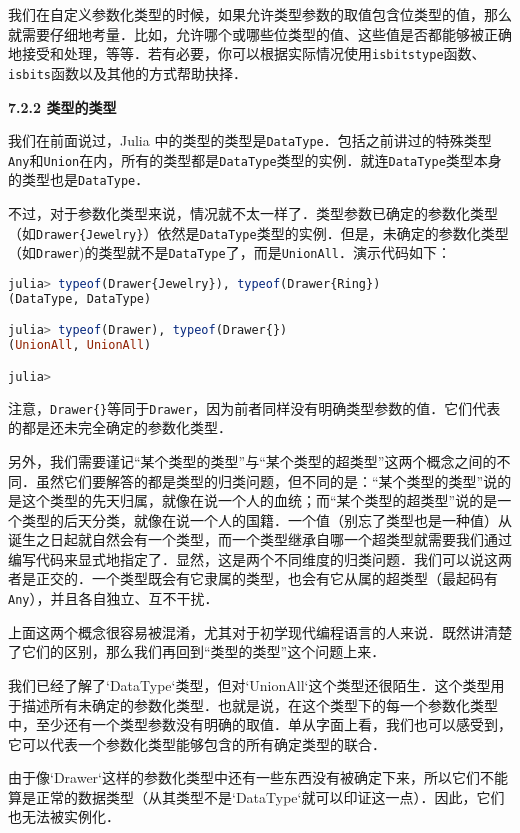 我们在自定义参数化类型的时候，如果允许类型参数的取值包含位类型的值，那么就需要仔细地考量．比如，允许哪个或哪些位类型的值、这些值是否都能够被正确地接受和处理，等等．若有必要，你可以根据实际情况使用\verb|isbitstype|函数、\verb|isbits|函数以及其他的方式帮助抉择．

\textbf{7.2.2 类型的类型}

我们在前面说过，Julia 中的类型的类型是\verb|DataType|．包括之前讲过的特殊类型\verb|Any|和\verb|Union|在内，所有的类型都是\verb|DataType|类型的实例．就连\verb|DataType|类型本身的类型也是\verb|DataType|．

不过，对于参数化类型来说，情况就不太一样了．类型参数已确定的参数化类型（如\verb|Drawer{Jewelry}|）依然是\verb|DataType|类型的实例．但是，未确定的参数化类型（如\verb|Drawer|)的类型就不是\verb|DataType|了，而是\verb|UnionAll|．演示代码如下：
\begin{lstlisting}[language=julia]
julia> typeof(Drawer{Jewelry}), typeof(Drawer{Ring})
(DataType, DataType)

julia> typeof(Drawer), typeof(Drawer{})
(UnionAll, UnionAll)

julia> 
\end{lstlisting}

注意，\verb|Drawer{}|等同于\verb|Drawer|，因为前者同样没有明确类型参数的值．它们代表的都是还未完全确定的参数化类型．

另外，我们需要谨记“某个类型的类型”与“某个类型的超类型”这两个概念之间的不同．虽然它们要解答的都是类型的归类问题，但不同的是：“某个类型的类型”说的是这个类型的先天归属，就像在说一个人的血统；而“某个类型的超类型”说的是一个类型的后天分类，就像在说一个人的国籍．一个值（别忘了类型也是一种值）从诞生之日起就自然会有一个类型，而一个类型继承自哪一个超类型就需要我们通过编写代码来显式地指定了．显然，这是两个不同维度的归类问题．我们可以说这两者是正交的．一个类型既会有它隶属的类型，也会有它从属的超类型（最起码有\verb|Any|），并且各自独立、互不干扰．

上面这两个概念很容易被混淆，尤其对于初学现代编程语言的人来说．既然讲清楚了它们的区别，那么我们再回到“类型的类型”这个问题上来．

我们已经了解了`DataType`类型，但对`UnionAll`这个类型还很陌生．这个类型用于描述所有未确定的参数化类型．也就是说，在这个类型下的每一个参数化类型中，至少还有一个类型参数没有明确的取值．单从字面上看，我们也可以感受到，它可以代表一个参数化类型能够包含的所有确定类型的联合．

由于像`Drawer`这样的参数化类型中还有一些东西没有被确定下来，所以它们不能算是正常的数据类型（从其类型不是`DataType`就可以印证这一点）．因此，它们也无法被实例化．

